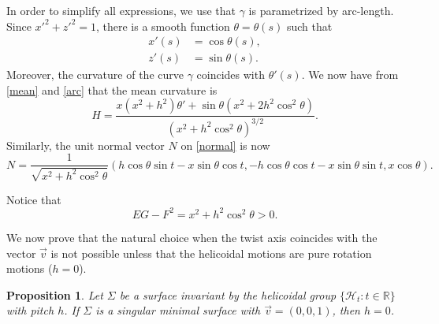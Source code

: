 \documentclass[a4paper,12pt]{amsart}
\newtheorem{proposition}[theorem]{Proposition}
\theoremstyle{definition}
\def\r{\mathbb R}
\begin{document}
In order to simplify all expressions, we use that $\gamma$ is parametrized by arc-length. Since $x'^2+z'^2=1$, there is a smooth function $\theta=\theta(s)$ such that
\begin{equation}\label{arc}
\begin{split}
x'(s)&=\cos\theta(s),\\
z'(s)&=\sin\theta(s).
\end{split}
\end{equation}
Moreover, the curvature of the curve $\gamma$ coincides with $\theta'(s)$. We now have from \eqref{mean} and \eqref{arc} that the mean curvature is
\begin{equation}\label{mean2}
H=  \frac{x (x^2+h^2) \theta '+\sin\theta  \left(x^2+2 h^2 \cos ^2\theta \right)}{ (x^2+h^2 \cos ^2\theta )^{3/2}}.
\end{equation}
Similarly, the unit normal vector $N$ on \eqref{normal} is now
\begin{equation}\label{normal2}
N=\frac{1}{\sqrt{x^2+h^2\cos ^2\theta}}\left(h\cos\theta\sin t-x\sin\theta\cos t,-h\cos\theta\cos t-x\sin\theta\sin t,x\cos\theta\right).
\end{equation}

Notice that 
\begin{equation}\label{reg}
EG-F^2=x^2+h^2 \cos ^2\theta>0.
\end{equation}

We now prove that the natural choice when the twist axis coincides with the vector $\vec{v}$ is not possible unless that the helicoidal motions are pure rotation motions ($h=0$).

\begin{proposition} \label{pr1}
Let $\Sigma$ be a   surface invariant by the helicoidal group $\{\mathcal{H}_t\colon t\in\r\}$ with pitch $h$.  If $\Sigma$ is a singular minimal surface with $\vec{v}=(0,0,1)$, then $h=0$.
\end{proposition}
\end{document}
